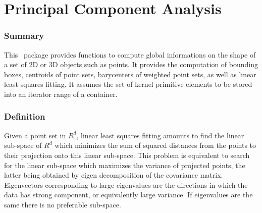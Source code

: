 
\chapter{Principal Component Analysis}
\label{ref_chapter_pca}


\subsection*{Summary}

This \cgal\ package provides functions to compute global informations
on the shape of a set of 2D or 3D objects such as points. It provides the computation of bounding boxes, centroids of point sets, barycenters of weighted point sets, as well as linear least squares fitting. It assumes the set of kernel primitive elements to be stored into an iterator range of a container.


\subsection*{Definition}
Given a point set in $R^d$, linear least squares fitting amounts to
find the linear sub-space of $R^d$ which minimizes the sum of squared
distances from the points to their projection onto this linear
sub-space. This problem is equivalent to search for the linear
sub-space which maximizes the variance of projected points, the latter
being obtained by eigen decomposition of the covariance
matrix. Eigenvectors corresponding to large eigenvalues are the
directions in which the data has strong component, or equivalently
large variance. If eigenvalues are the same there is no preferable
sub-space.


\\
\\
\\
\\
\\
\clearpage

